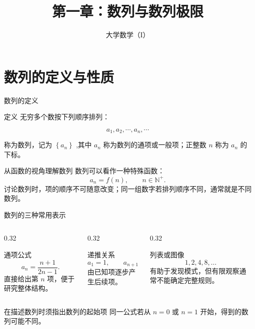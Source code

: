 \documentclass[aspectratio=169,10pt]{ctexbeamer}
\title[第一章：数列与数列极限]{第一章：数列与数列极限}
\author[大学数学（I）]{大学数学（I）}
\begin{document}
\begin{frame}[plain]
  \titlepage
\end{frame}







\section{数列的定义与性质}


\begin{frame}{数列的定义}
	
	
  \begin{block}{定义}
    无穷多个数按下列顺序排列：
    
    $$
    a_1, a_2, \cdots, a_n, \cdots
    $$
    
    称为数列，记为 $\left\{a_n\right\}$ ,其中 $a_n$ 称为数列的通项或一般项；正整数 $n$ 称为 $a_n$ 的下标。
  \end{block}
  \vspace{0.4cm}
  
  \pause

      \begin{exampleblock}{从函数的视角理解数列}
        数列可以看作一种特殊函数：
        \[
        a_n=f(n),\qquad n\in\mathbb{N}^+.
        \]
        讨论数列时，项的顺序不可随意改变；同一组数字若排列顺序不同，通常就是不同数列。
      \end{exampleblock}


\end{frame}

\begin{frame}{数列的三种常用表示}

  \begin{columns}[T,onlytextwidth]
    \begin{column}{0.32\textwidth}
      \begin{block}{通项公式}
        \[
          a_n=\frac{n+1}{2n-1}.
        \]
        直接给出第 $n$ 项，便于研究整体结构。
      \end{block}
    \end{column}
    \begin{column}{0.32\textwidth}
      \begin{block}{递推关系}
        \[
          a_1=1,\qquad a_{n+1}=2a_n+1.
        \]
        由已知项逐步产生后续项。
      \end{block}
    \end{column}
    \begin{column}{0.32\textwidth}
      \begin{block}{列表或图像}
        \[
          1,2,4,8,\ldots
        \]
        有助于发现模式，但有限观察通常不能确定完整规则。
      \end{block}
    \end{column}
  \end{columns}
  \vspace{0.7cm}
  \begin{alertblock}{在描述数列时须指出数列的起始项}
    同一公式若从 $n=0$ 或 $n=1$ 开始，得到的数列可能不同。
  \end{alertblock}
  
  
\end{frame}
\end{document}
